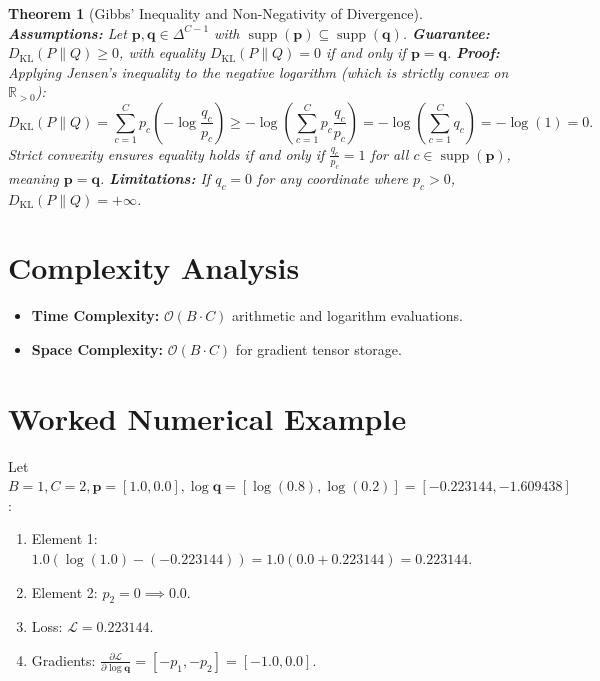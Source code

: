 \documentclass[11pt]{article}
\newtheorem{theorem}{Theorem}
\begin{document}
\begin{theorem}[Gibbs' Inequality and Non-Negativity of Divergence]
\label{thm:gibbs_inequality}
\textbf{Assumptions:} Let $\mathbf{p}, \mathbf{q} \in \Delta^{C-1}$ with $\operatorname{supp}(\mathbf{p}) \subseteq \operatorname{supp}(\mathbf{q})$.
\textbf{Guarantee:} $D_{\mathrm{KL}}(P \parallel Q) \ge 0$, with equality $D_{\mathrm{KL}}(P \parallel Q) = 0$ if and only if $\mathbf{p} = \mathbf{q}$.
\textbf{Proof:}
Applying Jensen's inequality to the negative logarithm (which is strictly convex on $\mathbb{R}_{>0}$):
\begin{equation}
D_{\mathrm{KL}}(P \parallel Q) = \sum_{c=1}^C p_c \left(-\log \frac{q_c}{p_c}\right) \ge -\log\left(\sum_{c=1}^C p_c \frac{q_c}{p_c}\right) = -\log\left(\sum_{c=1}^C q_c\right) = -\log(1) = 0.
\end{equation}
Strict convexity ensures equality holds if and only if $\frac{q_c}{p_c} = 1$ for all $c \in \operatorname{supp}(\mathbf{p})$, meaning $\mathbf{p} = \mathbf{q}$.
\textbf{Limitations:} If $q_c = 0$ for any coordinate where $p_c > 0$, $D_{\mathrm{KL}}(P \parallel Q) = +\infty$.
\end{theorem}

\section{Complexity Analysis}
\label{sec:complexity}

\begin{itemize}
    \item \textbf{Time Complexity:} $\mathcal{O}(B \cdot C)$ arithmetic and logarithm evaluations.
    \item \textbf{Space Complexity:} $\mathcal{O}(B \cdot C)$ for gradient tensor storage.
\end{itemize}

\section{Worked Numerical Example}
\label{sec:worked_example}

Let $B = 1, C = 2, \mathbf{p} = [1.0, 0.0], \log\mathbf{q} = [\log(0.8), \log(0.2)] = [-0.223144, -1.609438]$:
\begin{enumerate}
    \item Element 1: $1.0(\log(1.0) - (-0.223144)) = 1.0(0.0 + 0.223144) = 0.223144$.
    \item Element 2: $p_2 = 0 \implies 0.0$.
    \item Loss: $\mathcal{L} = 0.223144$.
    \item Gradients: $\frac{\partial \mathcal{L}}{\partial \log\mathbf{q}} = [-p_1, -p_2] = [-1.0, 0.0]$.
\end{enumerate}
\end{document}
